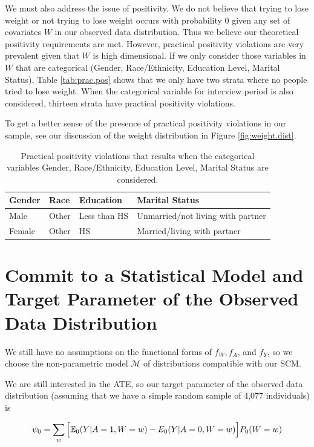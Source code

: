 \documentclass{article}
\begin{document}
We must also address the issue of positivity.  We do not believe that trying to lose weight or not trying to lose weight occurs with probability $0$ given any set of covariates $W$ in our observed data distribution.  Thus we believe our theoretical positivity requirements are met.  However, practical positivity violations are very prevalent given that $W$ is high dimensional.  If we only consider those variables in $W$ that are categorical (Gender, Race/Ethnicity, Education Level, Marital Status), Table \ref{tab:prac.pos} shows that we only have two strata where no people tried to lose weight. When the categorical variable for interview period is also considered, thirteen strata have practical positivity violations.

To get a better sense of the presence of practical positivity violations in our sample, see our discussion of the weight distribution in Figure \ref{fig:weight.dist}.

\begin{center}
\begin{table}
\begin{tabular}{| l | l | l | l |}
\hline
 Gender & Race & Education & Marital Status \\
\hline
Male & Other & Less than HS & Unmarried/not living with partner \\
Female & Other & HS & Married/living with partner \\
\hline
\end{tabular}
\caption{Practical positivity violations that results when the categorical variables Gender, Race/Ethnicity, Education Level, Marital Status are considered.}
\label{tab:proc.pos}
\end{table}
\end{center}

\section{Commit to a Statistical Model and Target Parameter of the Observed Data Distribution}

We still have no assumptions on the functional forms of $f_W, f_A$, and $f_Y$, so we choose the non-parametric model $\mathcal{M}$ of distributions compatible with our SCM.  

We are still interested in the ATE, so our target parameter of the observed data distribution (assuming that we have a simple random sample of 4,077 individuals) is

$$\psi_0 = \sum_{w}\Big[\mathbb{E}_0(Y|A=1,W=w)-E_0(Y|A=0,W=w)\Big]P_0(W=w)$$
\end{document}
